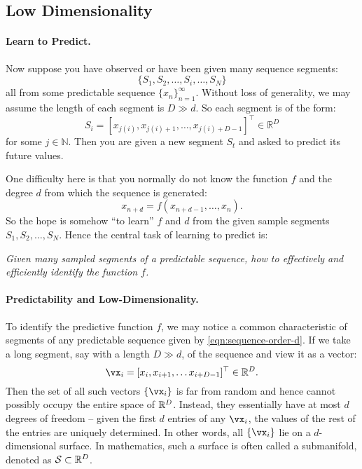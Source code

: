 \documentclass[../../book-main.tex]{subfiles}
\begin{document}
\subsection{Low Dimensionality}\label{sec:intro-low-dimensionality}
\paragraph{Learn to Predict.}
Now suppose you have observed or have been given many sequence segments:
\begin{equation}
    \{S_1, S_2, \ldots, S_i, \ldots, S_N\}
\end{equation}
all from some predictable sequence $\{x_n\}_{n=1}^\infty$. Without loss of generality, we may assume the length of each segment is $D \gg d$. So each segment is of the form:
\begin{equation}
    S_i = [x_{j(i)}, x_{j(i)+1}, \ldots, x_{j(i)+D-1}]^\top \in \mathbb{R}^D
\end{equation}
for some $j \in \mathbb{N}$. Then you are given a new segment $S_t$ and asked to predict its future values. 

One difficulty here is that you normally do not know the function $f$ and the degree $d$ from which the sequence is generated: 
\begin{equation}
    x_{n+d} = f(x_{n+d-1}, \ldots,  x_{n}).
\label{eqn:sequence-order-d}
\end{equation}
So the hope is somehow ``to learn'' $f$ and $d$ from the given sample segments $S_1, S_2, \ldots, S_N$. Hence the central task of learning to predict is:
\begin{center}
{\em Given many sampled segments of a predictable sequence, how to effectively and efficiently identify the function $f$.}
\end{center}

\paragraph{Predictability and Low-Dimensionality.}
To identify the predictive function $f$, we may notice a common characteristic of segments of any predictable sequence given by \eqref{eqn:sequence-order-d}. If we take a long segment, say with a length $D \gg d$, of the sequence and view it as a vector: 
\begin{equation}
    \vx_i = [x_i, x_{i+1}, \ldots x_{i+D-1}]^\top \in \mathbb{R}^D.
\end{equation}
Then the set of all such vectors $\{\vx_i\}$ is far from random and hence cannot possibly occupy the entire space of $\mathbb{R}^D$. Instead, they essentially have at most $d$ degrees of freedom -- given the first $d$ entries of any $\vx_i$, the values of the rest of the entries are uniquely determined. In other words, all $\{\vx_i\}$ lie on a $d$-dimensional surface. In mathematics, such a surface is often called a submanifold, denoted as $\mathcal{S} \subset \mathbb{R}^D$.
\end{document}
